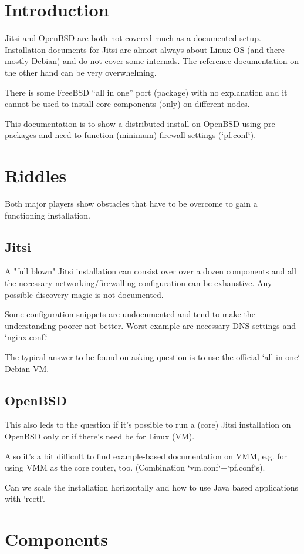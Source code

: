 \documentclass[conference]{IEEEtran}
\begin{document}
\section{Introduction}
Jitsi and OpenBSD are both not covered much as a documented setup. Installation documents
for Jitsi are almost always about Linux OS (and there mostly Debian) and do not cover
some internals. The reference documentation on the other hand can be very overwhelming.

There is some FreeBSD ``all in one'' port (package) with no explanation and it cannot be
used to install core components (only) on different nodes.

This documentation is to show a distributed install on OpenBSD using pre-packages and
need-to-function (minimum) firewall settings (`pf.conf`).

\section{Riddles}
Both major players show obstacles that have to be overcome to gain a functioning installation.
\subsection{Jitsi}
A "full blown" Jitsi installation can consist over over a dozen components and all the
necessary networking/firewalling configuration can be exhaustive. Any possible discovery
magic is not documented.

Some configuration snippets are undocumented and tend to make the understanding poorer
not better. Worst example are necessary DNS settings and `nginx.conf.`

The typical answer to be found on asking question is to use the official `all-in-one`
Debian VM.

\subsection{OpenBSD}
This also leds to the question if it's possible to run a (core) Jitsi installation on
OpenBSD only or if there's need be for Linux (VM).

Also it's a bit difficult to find example-based documentation on VMM, e.g. for using
VMM as the core router, too. (Combination `vm.conf`+`pf.conf`s).

Can we scale the installation horizontally and how to use Java based applications
with `rcctl`.
\section{Components}
\end{document}
